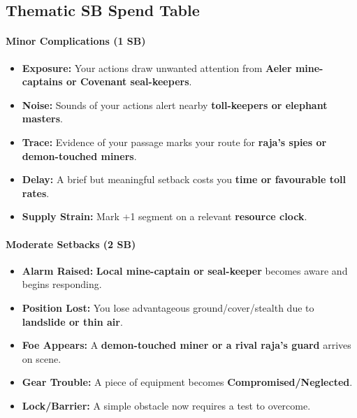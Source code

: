 \subsection*{Thematic SB Spend Table}
\label{sec:himadri-sb}

\paragraph{Minor Complications (1 SB)}
\begin{itemize}
\item \textbf{Exposure:} Your actions draw unwanted attention from \textbf{Aeler mine-captains or Covenant seal-keepers}.
\item \textbf{Noise:} Sounds of your actions alert nearby \textbf{toll-keepers or elephant masters}.
\item \textbf{Trace:} Evidence of your passage marks your route for \textbf{raja's spies or demon-touched miners}.
\item \textbf{Delay:} A brief but meaningful setback costs you \textbf{time or favourable toll rates}.
\item \textbf{Supply Strain:} Mark +1 segment on a relevant \textbf{resource clock}.
\end{itemize}

\paragraph{Moderate Setbacks (2 SB)}
\begin{itemize}
\item \textbf{Alarm Raised:} \textbf{Local mine-captain or seal-keeper} becomes aware and begins responding.
\item \textbf{Position Lost:} You lose advantageous ground/cover/stealth due to \textbf{landslide or thin air}.
\item \textbf{Foe Appears:} A \textbf{demon-touched miner or a rival raja's guard} arrives on scene.
\item \textbf{Gear Trouble:} A piece of equipment becomes \textbf{Compromised/Neglected}.
\item \textbf{Lock/Barrier:} A simple obstacle now requires a test to overcome.
\end{itemize}

